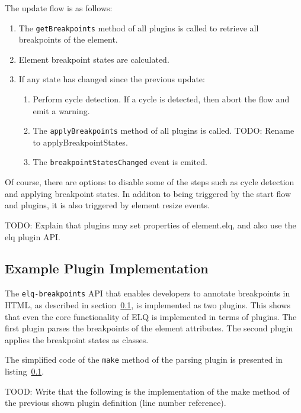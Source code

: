 \documentclass{acm_proc_article-sp}
\newcommand{\code}[1]{\texttt{#1}}
\newcommand{\elq}{ELQ}
\begin{document}
  The update flow is as follows:
  \begin{enumerate}
    \item The \code{getBreakpoints} method of all plugins is called to retrieve all breakpoints of the element.
    \item Element breakpoint states are calculated.
    \item If any state has changed since the previous update:
    \begin{enumerate}
      \item Perform cycle detection. If a cycle is detected, then abort the flow and emit a warning.
      \item The \code{applyBreakpoints} method of all plugins is called. TODO: Rename to applyBreakpointStates.
      \item The \code{breakpointStatesChanged} event is emited.
    \end{enumerate}
  \end{enumerate}

  Of course, there are options to disable some of the steps such as cycle detection and applying breakpoint states.
  In additon to being triggered by the start flow and plugins, it is also triggered by element resize events.

  TODO: Explain that plugins may set properties of element.elq, and also use the elq plugin API.

  \subsection{Example Plugin Implementation}
    The \code{elq-breakpoints} API that enables developers to annotate breakpoints in HTML, as described in section~\ref{}, is implemented as two plugins.
    This shows that even the core functionality of \elq{} is implemented in terms of plugins.
    The first plugin parses the breakpoints of the element attributes.
    The second plugin applies the breakpoint states as classes.

    The simplified code of the \code{make} method of the parsing plugin is presented in listing~\ref{}.

    TOOD: Write that the following is the implementation of the make method of the previous shown plugin definition (line number reference).
\end{document}
